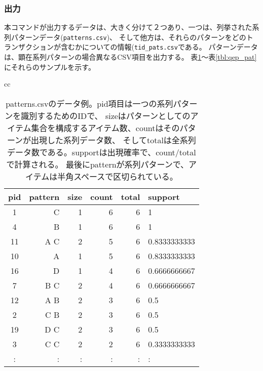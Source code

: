 \subsubsection{出力}
本コマンドが出力するデータは、大きく分けて２つあり、一つは、列挙された系列パターンデータ(\verb|patterns.csv|)、
そして他方は、それらのパターンをどのトランザクションが含むかについての情報(\verb|tid_pats.csv|である。
パターンデータは、顕在系列パターンの場合異なるCSV項目を出力する。
表\ref{tbl:qpat}〜表\ref{tbl:qep_pat}にそれらのサンプルを示す。

\begin{table}[htbp]
\begin{center}
\begin{tabular}{cc}

\begin{minipage}{0.6\hsize}
\begin{center}
\caption{patterns.csvのデータ例\label{tbl:qpat}。pid項目は一つの系列パターンを識別するためのIDで、
sizeはパターンとしてのアイテム集合を構成するアイテム数、countはそのパターンが出現した系列データ数、
そしてtotalは全系列データ数である。supportは出現確率で、count/totalで計算される。
最後にpatternが系列パターンで、アイテムは半角スペースで区切られている。}
{\small
\begin{tabular}{crrrrl}
\hline
pid&pattern&size&count&total&support \\
\hline
1  & C  &1&6&6&1\\
4  & B  &1&6&6&1\\
11 & A C&2&5&6&0.8333333333\\
10 & A  &1&5&6&0.8333333333\\
16 & D  &1&4&6&0.6666666667\\
7  & B C&2&4&6&0.6666666667\\
12 & A B&2&3&6&0.5\\
2  & C B&2&3&6&0.5\\
19 & D C&2&3&6&0.5\\
3  & C C&2&2&6&0.3333333333\\
:  & :  &:&:&:&:\\
\hline
\end{tabular} 
}
\end{center}
\end{minipage}


\end{tabular}
\end{center}
\end{table}
